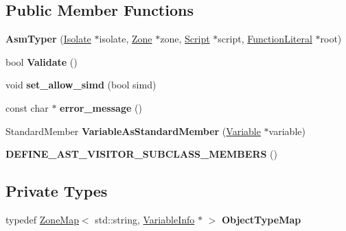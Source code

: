 \subsection*{Public Member Functions}
\begin{DoxyCompactItemize}
\item 
{\bfseries Asm\+Typer} (\hyperlink{classv8_1_1internal_1_1_isolate}{Isolate} $\ast$isolate, \hyperlink{classv8_1_1internal_1_1_zone}{Zone} $\ast$zone, \hyperlink{classv8_1_1internal_1_1_script}{Script} $\ast$script, \hyperlink{classv8_1_1internal_1_1_function_literal}{Function\+Literal} $\ast$root)\hypertarget{classv8_1_1internal_1_1_asm_typer_ac9263d583816e6e244fa645f2c2af52f}{}\label{classv8_1_1internal_1_1_asm_typer_ac9263d583816e6e244fa645f2c2af52f}

\item 
bool {\bfseries Validate} ()\hypertarget{classv8_1_1internal_1_1_asm_typer_a591f8996a620b2d77db7d3fdf8a62ea3}{}\label{classv8_1_1internal_1_1_asm_typer_a591f8996a620b2d77db7d3fdf8a62ea3}

\item 
void {\bfseries set\+\_\+allow\+\_\+simd} (bool simd)\hypertarget{classv8_1_1internal_1_1_asm_typer_a121e040ae0a36bf3d13065f7b069e728}{}\label{classv8_1_1internal_1_1_asm_typer_a121e040ae0a36bf3d13065f7b069e728}

\item 
const char $\ast$ {\bfseries error\+\_\+message} ()\hypertarget{classv8_1_1internal_1_1_asm_typer_a9037e023a7daba592b02559fdaca85f1}{}\label{classv8_1_1internal_1_1_asm_typer_a9037e023a7daba592b02559fdaca85f1}

\item 
Standard\+Member {\bfseries Variable\+As\+Standard\+Member} (\hyperlink{classv8_1_1internal_1_1_variable}{Variable} $\ast$variable)\hypertarget{classv8_1_1internal_1_1_asm_typer_aa0d36e23b4a161cdfed6245dbf107b99}{}\label{classv8_1_1internal_1_1_asm_typer_aa0d36e23b4a161cdfed6245dbf107b99}

\item 
{\bfseries D\+E\+F\+I\+N\+E\+\_\+\+A\+S\+T\+\_\+\+V\+I\+S\+I\+T\+O\+R\+\_\+\+S\+U\+B\+C\+L\+A\+S\+S\+\_\+\+M\+E\+M\+B\+E\+RS} ()\hypertarget{classv8_1_1internal_1_1_asm_typer_a86d04229ebddb93cb627274aeed54942}{}\label{classv8_1_1internal_1_1_asm_typer_a86d04229ebddb93cb627274aeed54942}

\end{DoxyCompactItemize}
\subsection*{Private Types}
\begin{DoxyCompactItemize}
\item 
typedef \hyperlink{classv8_1_1internal_1_1_zone_map}{Zone\+Map}$<$ std\+::string, \hyperlink{structv8_1_1internal_1_1_asm_typer_1_1_variable_info}{Variable\+Info} $\ast$ $>$ {\bfseries Object\+Type\+Map}\hypertarget{classv8_1_1internal_1_1_asm_typer_a68ed83b1319440e4c71e9d1dc796b4ba}{}\label{classv8_1_1internal_1_1_asm_typer_a68ed83b1319440e4c71e9d1dc796b4ba}

\end{DoxyCompactItemize}
